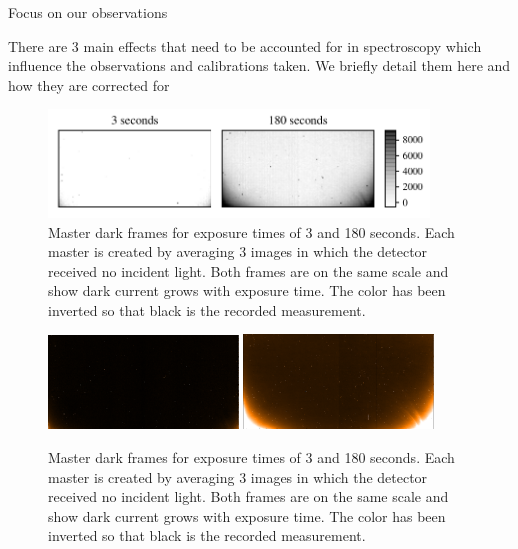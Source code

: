Focus on our observations

There are 3 main effects that need to be accounted for in {\nir} spectroscopy which influence the observations and calibrations taken. We briefly detail them here and how they are corrected for

\begin{figure}[h]
\centering
\includegraphics[width=0.9\textwidth]{figures/reduction/master_darks_1.pdf}
\caption{Master dark frames for exposure times of  3 and 180 seconds. Each master is created by averaging 3 images in which the detector received no incident light. Both frames are on the same scale and show dark current grows with exposure time. The color has been inverted so that black is the recorded measurement.}
\label{fig:darkcurrent}
\end{figure}
\begin{figure}[h]
    \centering
    \includegraphics[width=0.45\textwidth]{figures/reduction/MasterDarkFlat_1.png}
    \includegraphics[width=0.45\textwidth]{figures/reduction/MasterDarkSpec_1.png}
    \caption{Master dark frames for exposure times of  3 and 180 seconds. Each master is created by averaging 3 images in which the detector received no incident light. Both frames are on the same scale and show dark current grows with exposure time. The color has been inverted so that black is the recorded measurement.}
    \label{fig:darkcurrent}
\end{figure}

